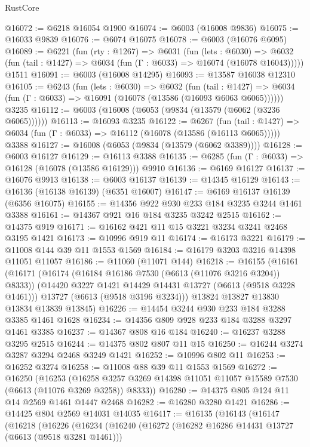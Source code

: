\begin{lexlean}{RustCore}
\begin{coremodule}
@16072 := @6218 @16054 @1900
@16074 := @6003 (@16008 @9836)
@16075 := @16033 @9839
@16076 := @6074 @16075
@16078 := @6003 (@16076 @6095)
@16089 := @6221
    (fun (rty : @1267) =>
    @6031
      (fun (lets : @6030) =>
      @6032 (fun (tail : @1427) => @6034 (fun (Γ : @6033) => @16074 (@16078 @16043)))))
    @1511
@16091 := @6003 (@16008 @14295)
@16093 := @13587 @16038 @12310
@16105 := @6243
    (fun (lets : @6030) =>
    @6032
      (fun (tail : @1427) =>
      @6034 (fun (Γ : @6033) => @16091 (@16078 (@13586 (@16093 @6063 @6065))))))
    @3235
@16112 := @6003 (@16008 (@6053 (@9834 (@13579 (@6062 (@3236 @6065))))))
@16113 := @16093 @3235
@16122 := @6267
    (fun (tail : @1427) => @6034 (fun (Γ : @6033) => @16112 (@16078 (@13586 (@16113 @6065)))))
    @3388
@16127 := @16008 (@6053 (@9834 (@13579 (@6062 @3389))))
@16128 := @6003 @16127
@16129 := @16113 @3388
@16135 := @6285 (fun (Γ : @6033) => @16128 (@16078 (@13586 @16129))) @9910
@16136 := @6169 @16127
@16137 := @16076 @9913
@16138 := @6003 @16137
@16139 := @14345 @16129
@16143 := @16136 (@16138 @16139) (@6351 @16007)
@16147 := @6169 @16137 @16139 (@6356 @16075)
@16155 := @14356 @922 @930 @233 @184 @3235 @3244 @1461 @3388
@16161 := @14367 @921 @16 @184 @3235 @3242 @2515
@16162 := @14375 @919
@16171 := @16162 @421 @11 @15 @3221 @3234 @3241 @2468 @3195 @1421
@16173 := @10996 @919 @11
@16174 := @16173 @3221
@16179 := @11008 @144 @39 @11 @1553 @1569
@16184 := @16179 @3203 @3216 @14398 @11051 @11057
@16186 := @11060 (@11071 @144)
@16218 := @16155
    (@16161
      (@16171
        (@16174 (@16184 @16186 @7530 (@6613 (@11076 @3216 @3204)) @8333))
        (@14420 @3227 @1421 @14429 @14431 @13727 (@6613 (@9518 @3228 @1461)))
        @13727
        (@6613 (@9518 @3196 @3234)))
      @13824
      @13827
      @13830
      @13834
      @13839
      @13845)
@16226 := @14454 @3244 @930 @233 @184 @3288 @3385 @1461 @1628
@16234 := @14356 @809 @928 @233 @184 @3288 @3297 @1461 @3385
@16237 := @14367 @808 @16 @184
@16240 := @16237 @3288 @3295 @2515
@16244 := @14375 @802 @807 @11 @15
@16250 := @16244 @3274 @3287 @3294 @2468 @3249 @1421
@16252 := @10996 @802 @11
@16253 := @16252 @3274
@16258 := @11008 @88 @39 @11 @1553 @1569
@16272 := @16250
    (@16253
      (@16258 @3257 @3269 @14398 @11051 @11057 @15589 @7530 (@6613 (@11076 @3269 @3258)) @8333))
@16280 := @14375 @805 @124 @11 @14 @2569 @1461 @1447 @2468
@16282 := @16280 @3280 @1421
@16286 := @14425 @804 @2569 @14031 @14035
@16417 := @16135
    (@16143
      (@16147
        (@16218
          (@16226
            (@16234
              (@16240
                (@16272
                  (@16282 @16286 @14431 @13727 (@6613 (@9518 @3281 @1461)))

\end{coremodule}
\end{lexlean}
